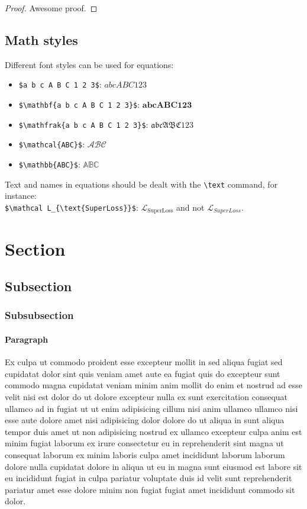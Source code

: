 \documentclass{melba}
\begin{document}
		\begin{proof}
			Awesome proof.
		\end{proof}

	\subsection{Math styles}
		Different font styles can be used for equations:
		\begin{itemize}
			\item \verb|$a b c A B C 1 2 3$|: $ a b c A B C 1 2 3 $
			\item \verb|$\mathbf{a b c A B C 1 2 3}$|: $ \mathbf{a b c A B C 1 2 3} $
			\item \verb|$\mathfrak{a b c A B C 1 2 3}$|: $ \mathfrak{a b c A B C 1 2 3} $
			\item \verb|$\mathcal{ABC}$|: $ \mathcal{ABC} $
			\item \verb|$\mathbb{ABC}$|: $ \mathbb{ABC} $
		\end{itemize}

		Text and names in equations should be dealt with the \verb|\text| command, for instance:\\
		\verb|$\mathcal L_{\text{SuperLoss}}$|: $\mathcal L_{\text{SuperLoss}}$ and not $\mathcal L_{SuperLoss}$.



\section{Section}
	\subsection{Subsection}
		\subsubsection{Subsubsection}
			\paragraph{Paragraph} Ex culpa ut commodo proident esse excepteur mollit in sed aliqua fugiat sed cupidatat dolor sint quis veniam amet aute ea fugiat quis do excepteur sunt commodo magna cupidatat veniam minim anim mollit do enim et nostrud ad esse velit nisi est dolor do ut dolore excepteur nulla ex sunt exercitation consequat ullamco ad in fugiat ut ut enim adipisicing cillum nisi anim ullamco ullamco nisi esse aute dolore amet nisi adipisicing dolor dolore do ut aliqua in sunt aliqua tempor duis amet ut non adipisicing nostrud ex ullamco excepteur culpa anim est minim fugiat laborum ex irure consectetur eu in reprehenderit sint magna ut consequat laborum ex minim laboris culpa amet incididunt laborum laborum dolore nulla cupidatat dolore in aliqua ut eu in magna sunt eiusmod est labore sit eu incididunt fugiat in culpa pariatur voluptate duis id velit sunt reprehenderit pariatur amet esse dolore minim non fugiat fugiat amet incididunt commodo sit dolor.
\end{document}
